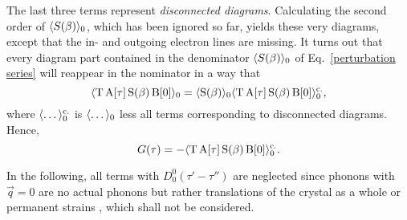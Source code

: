 The last three terms represent \emph{disconnected diagrams}. Calculating the
second order of $\langle S(\beta)\rangle_0$, which has been ignored so far, yields these
very diagrams, except that the in- and outgoing electron lines are missing. It
turns out that every diagram part contained in the denominator $\langle S(\beta)\rangle_0$
of Eq.~\ref{perturbation series} will reappear in the nominator in a way that
%
\begin{equation*}
    \langle\mathrm T \, \mathrm A[\tau] \, \mathrm S(\beta) \, \mathrm B[0]\rangle_0 =
    \langle\mathrm S(\beta)\rangle_0
    \langle\mathrm T \, \mathrm A[\tau] \, \mathrm S(\beta) \, \mathrm B[0]\rangle_0 \sp{\text{c.}},
\end{equation*}
%
where $\langle\dots\rangle_0 \sp{\text{c.}}$ is $\langle\dots\rangle_0$ less all terms corresponding to
disconnected diagrams. Hence,
%
\begin{equation*}
    G(\tau) = -\langle\mathrm T \, \mathrm A[\tau] \, \mathrm S(\beta) \, \mathrm B[0]\rangle_0
    \sp{\text{c.}}.
\end{equation*}

In the following, all terms with $D^0_0(\tau' - \tau'')$ are neglected since
phonons with $\vec q = 0$ are no actual phonons but rather translations of the
crystal as a whole or permanent strains \cite[p.~82]{Mahan00}, which shall not
be considered.

